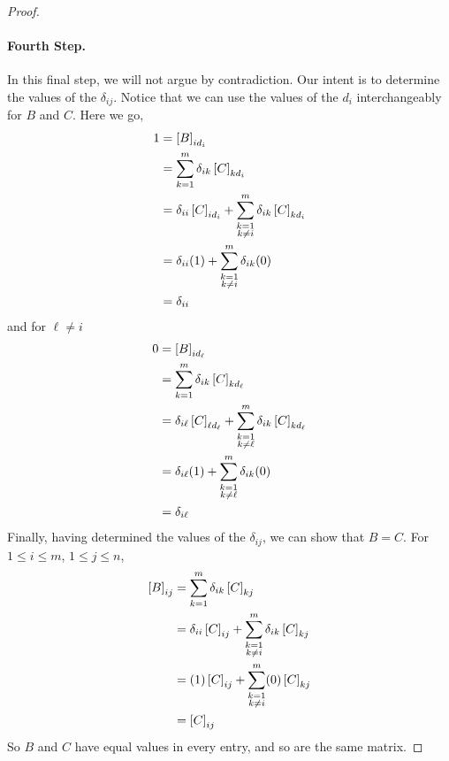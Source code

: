 \documentclass{ximera}
\begin{document}
\begin{theorem}
\begin{proof}
\paragraph*{Fourth Step.}  In this final step, we will not argue by contradiction.  Our intent is to determine the values of the $\delta_{ij}$.  Notice that we can use the values of the $d_i$ interchangeably for $B$ and $C$.  Here we go,
\begin{align*}
1
&=\left\lbrack B\right\rbrack_{id_i}
\\
&=\sum_{k=1}^{m}\delta_{ik}\left\lbrack C\right\rbrack_{kd_i}\\
&=
\delta_{ii}\left\lbrack C\right\rbrack_{id_i}
+
\sum_{\substack{k=1\\k\neq i}}^{m}\delta_{ik}\left\lbrack C\right\rbrack_{kd_i}
\\
&=
\delta_{ii}(1)
+
\sum_{\substack{k=1\\k\neq i}}^{m}\delta_{ik}(0)
\\
&=\delta_{ii}
\end{align*}
and for $\ell\neq i$
\begin{align*}
0
&=\left\lbrack B\right\rbrack_{id_\ell}
\\
&=\sum_{k=1}^{m}\delta_{ik}\left\lbrack C\right\rbrack_{kd_\ell}\\
&=
\delta_{i\ell}\left\lbrack C\right\rbrack_{\ell d_\ell}
+
\sum_{\substack{k=1\\k\neq\ell}}^{m}\delta_{ik}\left\lbrack C\right\rbrack_{kd_\ell}
\\
&=
\delta_{i\ell}(1)
+
\sum_{\substack{k=1\\k\neq\ell}}^{m}\delta_{ik}(0)
\\
&=\delta_{i\ell}
\end{align*}
Finally, having determined the values of the $\delta_{ij}$, we can show that $B=C$.  For $1\leq i\leq m$, $1\leq j\leq n$,
\begin{align*}
\left\lbrack B\right\rbrack_{ij}
&=\sum_{k=1}^{m}\delta_{ik}\left\lbrack C\right\rbrack_{kj}\\
&=
\delta_{ii}\left\lbrack C\right\rbrack_{ij}
+
\sum_{\substack{k=1\\k\neq i}}^{m}\delta_{ik}\left\lbrack C\right\rbrack_{kj}
\\
&=
(1)\left\lbrack C\right\rbrack_{ij}
+
\sum_{\substack{k=1\\k\neq i}}^{m}(0)\left\lbrack C\right\rbrack_{kj}\\
&=\left\lbrack C\right\rbrack_{ij}
\end{align*}
So $B$ and $C$ have equal values in every entry, and so are the same matrix.
\end{proof}
\end{theorem}
\end{document}
